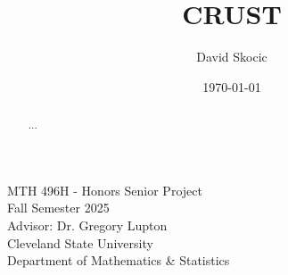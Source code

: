 \documentclass{article}
\title{CRUST}
\author{David Skocic}
\date{\today}
\begin{document}
\maketitle

\doublespacing
\vspace{1.5in}
\begin{center}
	\large MTH 496H - Honors Senior Project \\
	\large Fall Semester 2025 \\
	\large Advisor: Dr. Gregory Lupton \\
	\large Cleveland State University \\
	\large Department of Mathematics \& Statistics \\
\end{center}
\vspace{1in}
\newpage

\tableofcontents
\newpage

\begin{abstract}
	...
\end{abstract}

\newpage









\newpage
\nocite{*}


\end{document}
